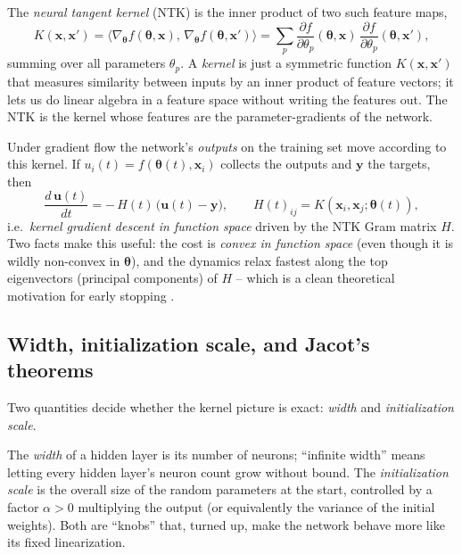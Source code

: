 \begin{definition}
The \emph{neural tangent kernel} (NTK) is the inner product of two such
feature maps,
\[
  K(\mathbf{x}, \mathbf{x}')
  = \big\langle \nabla_{\boldsymbol\theta} f(\boldsymbol\theta, \mathbf{x}),\,
    \nabla_{\boldsymbol\theta} f(\boldsymbol\theta, \mathbf{x}') \big\rangle
  = \sum_{p} \frac{\partial f}{\partial \theta_p}(\boldsymbol\theta,\mathbf{x})\,
    \frac{\partial f}{\partial \theta_p}(\boldsymbol\theta,\mathbf{x}'),
\]
summing over all parameters $\theta_p$. A \emph{kernel} is just a symmetric
function $K(\mathbf{x},\mathbf{x}')$ that measures similarity between
inputs by an inner product of feature vectors; it lets us do linear
algebra in a feature space without writing the features out. The NTK is the
kernel whose features are the parameter-gradients of the network.
\end{definition}

Under gradient flow the network's \emph{outputs} on the training set move
according to this kernel. If $u_i(t) = f(\boldsymbol\theta(t),\mathbf{x}_i)$
collects the outputs and $\mathbf{y}$ the targets, then
\citep{jacot2018}
\[
  \frac{d\,\mathbf{u}(t)}{dt} = -\,H(t)\,\big(\mathbf{u}(t) - \mathbf{y}\big),
  \qquad H(t)_{ij} = K(\mathbf{x}_i, \mathbf{x}_j; \boldsymbol\theta(t)),
\]
i.e.\ \emph{kernel gradient descent in function space} driven by the NTK
Gram matrix $H$. Two facts make this useful: the cost is \emph{convex in
function space} (even though it is wildly non-convex in
$\boldsymbol\theta$), and the dynamics relax fastest along the top
eigenvectors (principal components) of $H$ -- which is a clean theoretical
motivation for early stopping \citep{jacot2018}.

\subsection{Width, initialization scale, and Jacot's theorems}

Two quantities decide whether the kernel picture is exact: \emph{width}
and \emph{initialization scale}.

\begin{definition}
The \emph{width} of a hidden layer is its number of neurons; ``infinite
width'' means letting every hidden layer's neuron count grow without
bound. The \emph{initialization scale} is the overall size of the random
parameters at the start, controlled by a factor $\alpha>0$ multiplying the
output (or equivalently the variance of the initial weights). Both are
``knobs'' that, turned up, make the network behave more like its fixed
linearization.
\end{definition}

